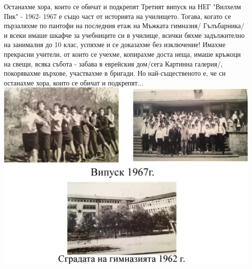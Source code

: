 \begin{multicols}{3}Останахме хора, които се обичат и подкрепят
Третият випуск на НЕГ "Вилхелм Пик" - 1962- 1967 е също част от историята на училището. Тогава, когато се пързаляхме по пантофи на последния етаж на Мъжката гимназия/ Гълъбарника/ и всеки имаше шкафче за учебниците си в училище, всички бяхме задължително на занималня до 10 клас, успяхме и се доказахме без изключение! 
Имахме прекрасни учители, от които се учехме, копирахме доста неща, 
имаше кръжоци на свещи, всяка събота - забава в еврейския дом/сега Картинна галерия/, покорявахме върхове, участвахме в бригади. Но най-същественото е, че си останахме хора, които се обичат и подкрепят... \\[19cm]

\includegraphics[width=5.5in]{./treti_vipusk/3.jpg} 

\end{multicols}
